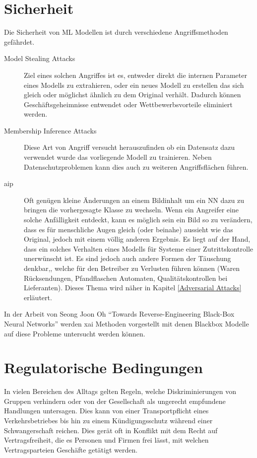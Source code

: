 \documentclass[
  12pt, %
  a4paper, %
  oneside, %
  openany, 
  numbers=noenddot, %
  BCOR=5mm, %
  parskip=half*, %
  thesis, %
]{bfhbook}
\begin{document}
\section{Sicherheit}
\label{Sicherheit}
Die Sicherheit von \Gls{ML} Modellen ist durch verschiedene Angriffsmethoden gefährdet.
\begin{description}
	\item[Model Stealing Attacks] Ziel eines solchen Angriffes ist es, entweder direkt die internen Parameter eines Modells zu extrahieren, oder ein neues Modell zu erstellen das sich gleich oder möglichst ähnlich zu dem Original verhält. Dadurch können Geschäftsgeheimnisse entwendet oder Wettbewerbsvorteile eliminiert werden.
	\item[Membership Inference Attacks] Diese Art von Angriff versucht herauszufinden ob ein Datensatz dazu verwendet wurde das vorliegende Modell zu trainieren. Neben Datenschutzproblemen kann dies auch zu weiteren Angriffsflächen führen.
	\item[\acrfull{aip}] Oft genügen kleine Änderungen an einem Bildinhalt um ein \gls{NN} dazu zu bringen die vorhergesagte Klasse zu wechseln. Wenn ein Angreifer eine solche Anfälligkeit entdeckt, kann es möglich sein ein Bild so zu verändern, dass es für menschliche Augen gleich (oder beinahe) aussieht wie das Original, jedoch mit einem völlig anderen Ergebnis. Es liegt auf der Hand, dass ein solches Verhalten eines Modells für Systeme einer Zutrittskontrolle unerwünscht ist. Es sind jedoch auch andere Formen der Täuschung denkbar,, welche für den Betreiber zu Verlusten führen können (Waren Rücksendungen, Pfandflaschen Automaten, Qualitätskontrollen bei Lieferanten). Dieses Thema wird näher in Kapitel \ref{Adversarial Attacks} erläutert.
\end{description}

In der Arbeit von Seong Joon Oh ``Towards Reverse-Engineering Black-Box Neural Networks'' \parencite{Oh2019} werden \Gls{xai} Methoden vorgestellt mit denen \Gls{Blackbox} Modelle auf diese Probleme untersucht werden können.

\section{Regulatorische Bedingungen}
In vielen Bereichen des Alltags gelten Regeln, welche Diskriminierungen von Gruppen verhindern oder von der Gesellschaft als ungerecht empfundene Handlungen untersagen. Dies kann von einer Transportpflicht eines Verkehrsbetriebes bis hin zu einem Kündigungsschutz während einer Schwangerschaft reichen. Dies gerät oft in Konflikt mit dem Recht auf Vertragsfreiheit, die es Personen und Firmen frei lässt, mit welchen Vertragsparteien Geschäfte getätigt werden.
\end{document}
